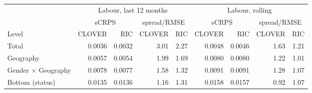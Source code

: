 \begin{tabular}{lrrrrrrrr}
\toprule
 & \multicolumn{4}{c}{Labour, last 12 months} & \multicolumn{4}{c}{Labour, rolling} \\
\cmidrule(lr){2-5} \cmidrule(lr){6-9}
 & \multicolumn{2}{c}{sCRPS} & \multicolumn{2}{c}{spread/RMSE} & \multicolumn{2}{c}{sCRPS} & \multicolumn{2}{c}{spread/RMSE} \\
Level & CLOVER & RIC & CLOVER & RIC & CLOVER & RIC & CLOVER & RIC \\
\midrule
Total & 0.0036 & 0.0032 & 3.01 & 2.27 & 0.0048 & 0.0046 & 1.63 & 1.21 \\
Geography & 0.0057 & 0.0054 & 1.99 & 1.69 & 0.0080 & 0.0080 & 1.22 & 1.01 \\
Gender $\times$ Geography & 0.0078 & 0.0077 & 1.58 & 1.32 & 0.0091 & 0.0091 & 1.28 & 1.07 \\
Bottom (status) & 0.0135 & 0.0136 & 1.16 & 1.31 & 0.0158 & 0.0157 & 0.92 & 1.07 \\
\bottomrule
\end{tabular}
